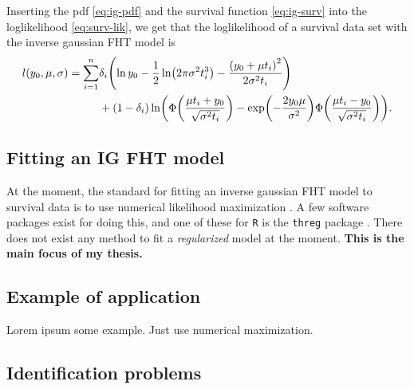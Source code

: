 Inserting the pdf \eqref{eq:ig-pdf} and the survival function \eqref{eq:ig-surv} into the loglikelihood \eqref{eq:surv-lik}, we get that the loglikelihood of a survival data set with the inverse gaussian FHT model is
\begin{align}\label{eq:loglik}
\begin{split}
    l(y_0,\mu,\sigma)=\sum_{i=1}^n&\di\p*{\ln y_0-\frac{1}{2}\ln\p*{2\pi\sigma^2\ti^3}-\frac{\p*{y_0+\mu\ti}^2}{2\sigma^2\ti}} \\
    &+
    (1-\di)\ln\p*{\Phi\p*{\frac{\mu\ti+y_0}{\sqrt{\sigma^2\ti}}}-\exp\p*{-\frac{2y_0\mu}{\sigma^2}}\Phi\p*{\frac{\mu\ti-y_0}{\sqrt{\sigma^2\ti}}}}.
\end{split}
\end{align}

\subsection{Fitting an IG FHT model}
At the moment, the standard for fitting an inverse gaussian FHT model to survival data is to use numerical likelihood maximization \cite{caroni2017}. A few software packages exist for doing this, and one of these for \verb|R| \cite{Rlang} is the \verb|threg| package \cite{threg}. There does not exist any method to fit a \textit{regularized} model at the moment. \textbf{This is the main focus of my thesis.}


\subsection{Example of application}
Lorem ipsum some example. Just use numerical maximization.


\subsection{Identification problems}